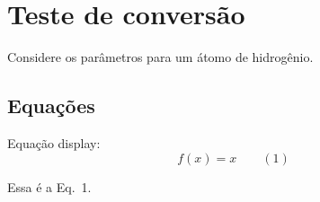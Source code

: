 \section{Teste de conversão}

Considere os parâmetros para um átomo de hidrogênio.

\subsection{Equações}

Equação display: \protect\hypertarget{eq:label1}{}{\[
    f(x) = x
\qquad{(1)}\]}

Essa é a Eq.~1.